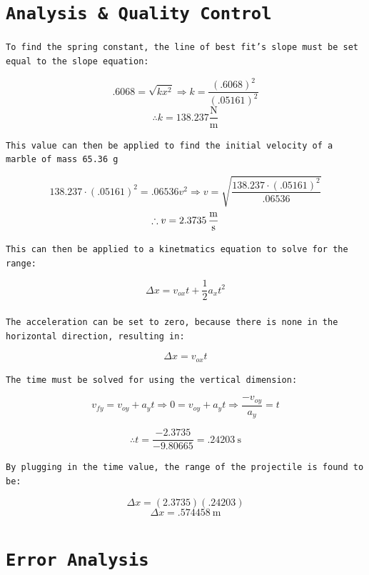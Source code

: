 \documentclass{article}
\begin{document}

\newpage

\section{\texttt{Analysis \& Quality Control}}

\texttt{To find the spring constant, the line of best fit's slope must be set equal to the slope equation:}

$$ .6068 = \sqrt{kx^2} \Longrightarrow k = \frac{(.6068)^2}{(.05161)^2}$$
$$ \therefore k = 138.237 \frac{\text{N}}{\text{m}}$$

\texttt{This value can then be applied to find the initial velocity of a marble of mass \SI{65.36}{\gram}}

$$ 138.237 \cdot (.05161)^2 = .06536v^2 \Longrightarrow v = \sqrt{\frac{138.237 \cdot (.05161)^2}{.06536}} $$
$$ \therefore v = \SI{2.3735}{\frac\meter\second} $$

\texttt{This can then be applied to a kinetmatics equation to solve for the range:}

$$\Delta x = v_{ox}t + \frac{1}{2}a_{x}t^2$$\\

\texttt{The acceleration can be set to zero, because there is none in the horizontal direction, resulting in:}

$$\Delta x = v_{ox}t$$

\texttt{The time must be solved for using the vertical dimension:}

$$ v_{fy} = v_{oy} + a_yt \Longrightarrow 0 = v_{oy} + a_yt \Longrightarrow \frac{-v_{oy}}{a_y} = t$$

$$ \therefore t = \frac{-2.3735}{-9.80665} = \SI{.24203}{\second} $$

\texttt{By plugging in the time value, the range of the projectile is found to be:}

$$ \Delta x = (2.3735)(.24203) $$
$$ \Delta x = \SI{.574458}{\meter}$$



\section{\texttt{Error Analysis}}
\end{document}
